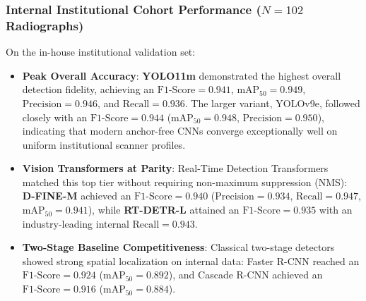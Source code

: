 \documentclass[10pt,journal,compsoc]{IEEEtran}
\begin{document}
\subsubsection{Internal Institutional Cohort Performance (\texorpdfstring{$N=102$}{N=102} Radiographs)}
On the in-house institutional validation set:
\begin{itemize}
    \item \textbf{Peak Overall Accuracy}: \textbf{YOLO11m} demonstrated the highest overall detection fidelity, achieving an $\text{F1-Score} = 0.941$, $\text{mAP}_{50} = 0.949$, $\text{Precision} = 0.946$, and $\text{Recall} = 0.936$. The larger variant, YOLOv9e, followed closely with an $\text{F1-Score} = 0.944$ ($\text{mAP}_{50} = 0.948$, $\text{Precision} = 0.950$), indicating that modern anchor-free CNNs converge exceptionally well on uniform institutional scanner profiles.
    \item \textbf{Vision Transformers at Parity}: Real-Time Detection Transformers matched this top tier without requiring non-maximum suppression (NMS): \textbf{D-FINE-M} achieved an $\text{F1-Score} = 0.940$ ($\text{Precision} = 0.934$, $\text{Recall} = 0.947$, $\text{mAP}_{50} = 0.941$), while \textbf{RT-DETR-L} attained an $\text{F1-Score} = 0.935$ with an industry-leading internal $\text{Recall} = 0.943$.
    \item \textbf{Two-Stage Baseline Competitiveness}: Classical two-stage detectors showed strong spatial localization on internal data: Faster R-CNN reached an $\text{F1-Score} = 0.924$ ($\text{mAP}_{50} = 0.892$), and Cascade R-CNN achieved an $\text{F1-Score} = 0.916$ ($\text{mAP}_{50} = 0.884$).
\end{itemize}
\end{document}
